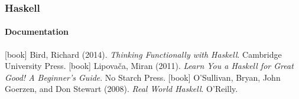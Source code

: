 \documentclass{beamer}
\begin{document}
\begin{frame}
  \frametitle{Haskell}
  \framesubtitle{Documentation}

  \begin{thebibliography}{O'Sullivan, Goerzen, and Stewart 2008}
  [book]
    Bird, Richard (2014).
    \newblock \emph{Thinking Functionally with Haskell}.
    \newblock Cambridge University Press.
  [book]
    Lipovača, Miran (2011).
    \newblock \emph{Learn You a Haskell for Great Good! A Beginner's Guide}.
    \newblock No Starch Press.
  [book]
    O'Sullivan, Bryan, John Goerzen, and Don Stewart (2008).
    \newblock \emph{Real World Haskell}.
    \newblock O'Reilly.
  \end{thebibliography}
\end{frame}

\end{document}
